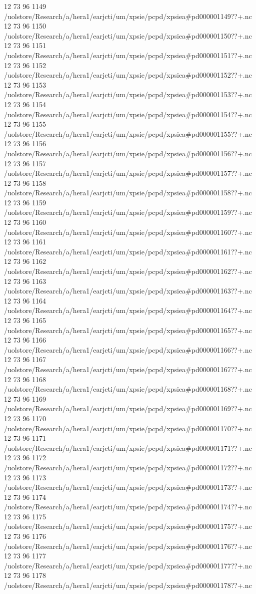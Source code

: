 12 73 96
1149
/uolstore/Research/a/hera1/earjcti/um/xpsie/pcpd/xpsiea#pd000001149??+.nc
12 73 96
1150
/uolstore/Research/a/hera1/earjcti/um/xpsie/pcpd/xpsiea#pd000001150??+.nc
12 73 96
1151
/uolstore/Research/a/hera1/earjcti/um/xpsie/pcpd/xpsiea#pd000001151??+.nc
12 73 96
1152
/uolstore/Research/a/hera1/earjcti/um/xpsie/pcpd/xpsiea#pd000001152??+.nc
12 73 96
1153
/uolstore/Research/a/hera1/earjcti/um/xpsie/pcpd/xpsiea#pd000001153??+.nc
12 73 96
1154
/uolstore/Research/a/hera1/earjcti/um/xpsie/pcpd/xpsiea#pd000001154??+.nc
12 73 96
1155
/uolstore/Research/a/hera1/earjcti/um/xpsie/pcpd/xpsiea#pd000001155??+.nc
12 73 96
1156
/uolstore/Research/a/hera1/earjcti/um/xpsie/pcpd/xpsiea#pd000001156??+.nc
12 73 96
1157
/uolstore/Research/a/hera1/earjcti/um/xpsie/pcpd/xpsiea#pd000001157??+.nc
12 73 96
1158
/uolstore/Research/a/hera1/earjcti/um/xpsie/pcpd/xpsiea#pd000001158??+.nc
12 73 96
1159
/uolstore/Research/a/hera1/earjcti/um/xpsie/pcpd/xpsiea#pd000001159??+.nc
12 73 96
1160
/uolstore/Research/a/hera1/earjcti/um/xpsie/pcpd/xpsiea#pd000001160??+.nc
12 73 96
1161
/uolstore/Research/a/hera1/earjcti/um/xpsie/pcpd/xpsiea#pd000001161??+.nc
12 73 96
1162
/uolstore/Research/a/hera1/earjcti/um/xpsie/pcpd/xpsiea#pd000001162??+.nc
12 73 96
1163
/uolstore/Research/a/hera1/earjcti/um/xpsie/pcpd/xpsiea#pd000001163??+.nc
12 73 96
1164
/uolstore/Research/a/hera1/earjcti/um/xpsie/pcpd/xpsiea#pd000001164??+.nc
12 73 96
1165
/uolstore/Research/a/hera1/earjcti/um/xpsie/pcpd/xpsiea#pd000001165??+.nc
12 73 96
1166
/uolstore/Research/a/hera1/earjcti/um/xpsie/pcpd/xpsiea#pd000001166??+.nc
12 73 96
1167
/uolstore/Research/a/hera1/earjcti/um/xpsie/pcpd/xpsiea#pd000001167??+.nc
12 73 96
1168
/uolstore/Research/a/hera1/earjcti/um/xpsie/pcpd/xpsiea#pd000001168??+.nc
12 73 96
1169
/uolstore/Research/a/hera1/earjcti/um/xpsie/pcpd/xpsiea#pd000001169??+.nc
12 73 96
1170
/uolstore/Research/a/hera1/earjcti/um/xpsie/pcpd/xpsiea#pd000001170??+.nc
12 73 96
1171
/uolstore/Research/a/hera1/earjcti/um/xpsie/pcpd/xpsiea#pd000001171??+.nc
12 73 96
1172
/uolstore/Research/a/hera1/earjcti/um/xpsie/pcpd/xpsiea#pd000001172??+.nc
12 73 96
1173
/uolstore/Research/a/hera1/earjcti/um/xpsie/pcpd/xpsiea#pd000001173??+.nc
12 73 96
1174
/uolstore/Research/a/hera1/earjcti/um/xpsie/pcpd/xpsiea#pd000001174??+.nc
12 73 96
1175
/uolstore/Research/a/hera1/earjcti/um/xpsie/pcpd/xpsiea#pd000001175??+.nc
12 73 96
1176
/uolstore/Research/a/hera1/earjcti/um/xpsie/pcpd/xpsiea#pd000001176??+.nc
12 73 96
1177
/uolstore/Research/a/hera1/earjcti/um/xpsie/pcpd/xpsiea#pd000001177??+.nc
12 73 96
1178
/uolstore/Research/a/hera1/earjcti/um/xpsie/pcpd/xpsiea#pd000001178??+.nc
